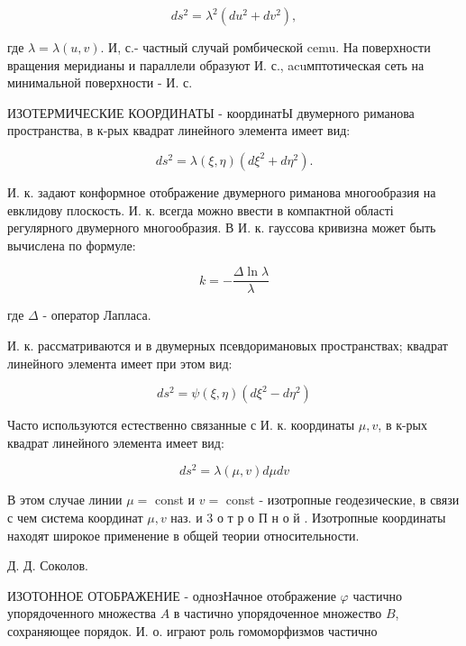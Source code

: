 \documentclass[10pt]{article}
\begin{document}
\[

d s^{2}=\lambda^{2}\left(d u^{2}+d v^{2}\right),

\]



где $\lambda=\lambda(u, v)$. И, с.- частный случай ромбической cemu. На поверхности вращения меридианы и параллели образуют И. с., acuмптотическая сеть на минимальной поверхности - И. с.



ИЗОТЕРМИЧЕСКИЕ КООРДИНАТЫ - координатЫ двумерного риманова пространства, в к-рых квадрат линейного элемента имеет вид:



\[

d s^{2}=\lambda(\xi, \eta)\left(d \xi^{2}+d \eta^{2}\right) .

\]



И. к. задают конформное отображение двумерного риманова многообразия на евклидову плоскость. И. к. всегда можно ввести в компактной області регулярного двумерного многообразия. В И. к. гауссова кривизна может быть вычислена по формуле:



\[

k=-\frac{\Delta \ln \lambda}{\lambda}

\]



где $\Delta$ - оператор Лапласа.



И. к. рассматриваются и в двумерных псевдоримановых пространствах; квадрат линейного элемента имеет при этом вид:



\[

d s^{2}=\psi(\xi, \eta)\left(d \xi^{2}-d \eta^{2}\right)

\]



Часто используются естественно связанные с И. к. координаты $\mu, v$, в к-рых квадрат линейного элемента имеет вид:



\[

d s^{2}=\lambda(\mu, v) d \mu d v

\]



В этом случае линии $\mu=$ const и $v=$ const - изотропные геодезические, в связи с чем система координат $\mu, v$ наз. и 3 о т р о П н о й . Изотропные координаты находят широкое применение в общей теории относительности.



Д. Д. Соколов.



ИЗОТОННОЕ ОТОБРАЖЕНИЕ - однозНачное отображение $\varphi$ частично упорядоченного множества $A$ в частично упорядоченное множество $B$, сохраняющее порядок. И. о. играют роль гомоморфизмов частично
\end{document}
